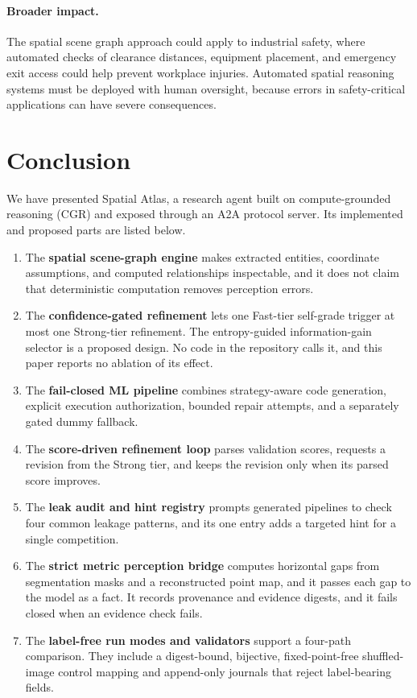 \documentclass{article}
\begin{document}
\paragraph{Broader impact.}
The spatial scene graph approach could apply to industrial safety, where automated checks of clearance distances, equipment placement, and emergency exit access could help prevent workplace injuries. Automated spatial reasoning systems must be deployed with human oversight, because errors in safety-critical applications can have severe consequences.

\section{Conclusion}
\label{sec:conclusion}

We have presented Spatial Atlas, a research agent built on compute-grounded reasoning (CGR) and exposed through an A2A protocol server. Its implemented and proposed parts are listed below.
\begin{enumerate}[leftmargin=*,nosep]
  \item The \textbf{spatial scene-graph engine} makes extracted entities, coordinate assumptions, and computed relationships inspectable, and it does not claim that deterministic computation removes perception errors.
  \item The \textbf{confidence-gated refinement} lets one Fast-tier self-grade trigger at most one Strong-tier refinement. The entropy-guided information-gain selector is a proposed design. No code in the repository calls it, and this paper reports no ablation of its effect.
  \item The \textbf{fail-closed ML pipeline} combines strategy-aware code generation, explicit execution authorization, bounded repair attempts, and a separately gated dummy fallback.
  \item The \textbf{score-driven refinement loop} parses validation scores, requests a revision from the Strong tier, and keeps the revision only when its parsed score improves.
  \item The \textbf{leak audit and hint registry} prompts generated pipelines to check four common leakage patterns, and its one entry adds a targeted hint for a single competition.
  \item The \textbf{strict metric perception bridge} computes horizontal gaps from segmentation masks and a reconstructed point map, and it passes each gap to the model as a fact. It records provenance and evidence digests, and it fails closed when an evidence check fails.
  \item The \textbf{label-free run modes and validators} support a four-path comparison. They include a digest-bound, bijective, fixed-point-free shuffled-image control mapping and append-only journals that reject label-bearing fields.
\end{enumerate}
\end{document}

